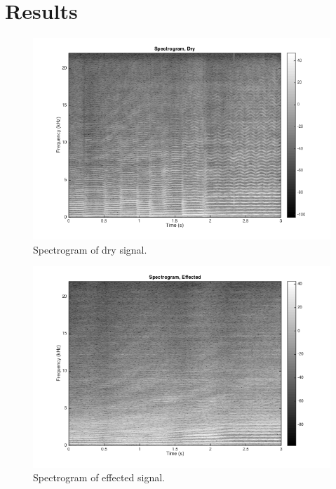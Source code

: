\section{Results}

\begin{figure}[ht]
\centering
\includegraphics[width=\textwidth]{dry_spec.png}
\caption{Spectrogram of dry signal.}
\label{fig:dryspec}
\end{figure}
\begin{figure}[ht]
\centering
\includegraphics[width=\textwidth]{effected_spec.png}
\caption{Spectrogram of effected signal.}
\label{fig:effspec}
\end{figure}